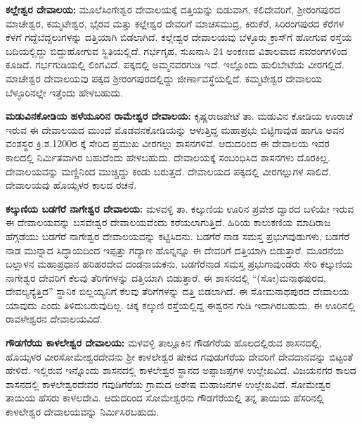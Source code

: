\vskip 3pt

\textbf{ಕಲ್ಲೇಶ್ವರ ದೇವಾಲಯ: } ಮೂಲೆಸಿಂಗೇಶ್ವರ ದೇವಾಲಯಕ್ಕೆ ದತ್ತಿಯನ್ನು ಬಿಡುವಾಗ, ಕಲಿದೇವರಿಗೆ, ಶ‍್ರೀರಂಗಪುರದ ಮಾಚೇಶ್ವರ, ಕಮ್ಮಟೇಶ್ವರ, ಭೈರವ ಮತ್ತು ಕಲ್ಲೇಶ್ವರ ದೇವರಿಗೆ ಮಾಚಸಮುದ್ರ, ಕಿರುಕೆರೆ, ಸಿರಿರಂಗಪುರದ ಕೆರೆಗಳ ಕೆಳಗೆ ಗದ್ದೆಬೆದ್ದಲುಗಳನ್ನು ದತ್ತಿಯಾಗಿ ಬಿಡಲಾಗಿದೆ. ಕಲ್ಲೇಶ್ವರ ದೇವಾಲಯವು ಬೆಳ್ಳೂರು ಕ್ರಾಸ್​ಗೆ ಹೋಗುವ ರಸ್ತೆಯ ಬದಿಯಲ್ಲಿದ್ದು ಬಿದ್ದುಹೋಗುವ ಸ್ಥಿತಿಯಲ್ಲಿದೆ. ಗರ್ಭಗೃಹ, ಸುಖನಾಸಿ 24 ಅಂಕಣದ ವಿಶಾಲವಾದ ನವರಂಗಗಳಿಂದ ಕೂಡಿದೆ. ಗರ್ಭಗುಡಿಯಲ್ಲಿ ಲಿಂಗವಿದೆ. ಪಕ್ಕದಲ್ಲಿ ಅಮ್ಮನವರಗುಡಿ ಇದೆ. ಇಲ್ಲೊಂದು ಹುಲಿಬೇಟೆಯ ವೀರಗಲ್ಲಿದೆ. ಮಾಚೇಶ್ವರ ದೇವಾಲಯವು ಪಕ್ಕದ ಶ‍್ರೀರಂಗಪುರದಲ್ಲಿದ್ದು ಜೀರ್ಣಾವಸ್ಥೆಯಲ್ಲಿದೆ. ಕಮ್ಮಟೇಶ್ವರ ದೇವಾಲಯ ಬೆಳ್ಳೂರಿನಲ್ಲೇ ಇತ್ತೆಂದು ಹೇಳಬಹುದು.

\vskip 3pt

\textbf{ಮಡುವಿನಕೋಡಿಯ ಹಳೆಯೂರಿನ ರಾಮೇಶ್ವರ ದೇವಾಲಯ:} ಕೃಷ್ಣರಾಜಪೇಟೆ ತಾ. ಮಡುವಿನ ಕೋಡಿಯ \hbox{ಊರಾಚೆ} ಇರುವ ಈ ದೇವಾಲಯದ ಮುಂದೆ ಮೊಡವನಕೋಡಿ\-ಯನ್ನು ಆಳುತ್ತಿದ್ದ ಮಹಾಪ್ರಭು ಬಿಟ್ಟಿಗಾವುಡ ಹಾಗೂ ಅವನ ವಂಶಸ್ಥರ ಕ್ರಿ.ಶ.1200ರ ಕ್ಕೆ ಸೇರಿದ ಪ್ರಮುಖ ವೀರಗಲ್ಲು ಶಾಸನಗಳಿವೆ. ಆದುದರಿಂದ ಈ ದೇವಾಲಯ ಇವರ ಕಾಲದಲ್ಲಿ ನಿರ್ಮಿತವಾಗಿರ ಬಹುದೆಂದು ಹೇಳಬಹುದು. ದೇವಾಲಯಕ್ಕೆ ಸಂಬಂಧಿಸಿದ ಶಾಸನಗಳು ದೊರಕಿಲ್ಲ. ದೇವಾಲಯವನ್ನು ಮಣ್ಣಿನಿಂದ ಮುಚ್ಚಿದ್ದು ಕಂಡು ಬರುತ್ತದೆ. ದೇವಾಲಯದ ಪಕ್ಕದಲ್ಲಿ ವೀರಗಲ್ಲುಗಳ ಸಾಲಿದೆ. ದೇವಾಲಯವು ಹೊಯ್ಸಳರ ಕಾಲದ ರಚನೆ.

\vskip 3pt

\textbf{ಕಲ್ಕುಣಿಯ ಬಡಗೆರೆ ನಾಗೇಶ್ವರ ದೇವಾಲಯ:} ಮಳವಳ್ಳಿ ತಾ. ಕಲ್ಕುಣಿಯ ಊರಿನ ಪ್ರವೇಶ ದ್ವಾರದ ಬಳಿಯೇ ಇರುವ ಈ ದೇವಾಲಯವನ್ನು ಬಸವೇಶ್ವರ ದೇವಾಲಯವೆಂದು ಕರೆಯಲಾಗುತ್ತಿದೆ. ಹಿರಿಯ ಕಾಲುಕಣಿಯ ಮಾದಿರಾಜ ಹೆಗ್ಗಡೆಯು ಬಡಗೆರೆ ನಾಗೇಶ್ವರ ದೇವಾಲಯವನ್ನು ಕಟ್ಟಿಸಿದನು. ಬಡಗೆರೆ ನಾಡ ಸಮಸ್ತ ಪ್ರಭುಗವುಡುಗಳು, ಬಡಗೆರೆ ನಾಡ ಮುನ್ನಾದ ಸಿದ್ಧಾಯದಿಂದ ಇಪ್ಪತ್ತು ಗದ್ಯಾಣ ಹೊನ್ನನ್ನೂ ಈ ದೇವರಿಗೆ ದತ್ತಿಯಾಗಿ ಬಿಡುತ್ತಾರೆ. ಮೂರನೆಯ ಬಲ್ಲಾಳನ ಮಹಾಪ್ರಧಾನ ಹರಿಹರದೇವ ದಂಡನಾಯಕನು, ಬಡಗೆರೆನಾಡ ಸಮಸ್ತ ಪ್ರಭುಗಾವುಂಡರು ಸೇರಿ ಕಲ್ಕುಣಿಯ ನಾಗೇಶ್ವರ ದೇವರಿಗೆ ಕೆಲವು ತೆರಿಗೆಗಳನ್ನು ದತ್ತಿಯಾಗಿ ಬಿಡುತ್ತಾರೆ. ಈ ಶಾಸನದಲ್ಲಿ “(ಸೋ)ಮನಾಥಪುರದ, ದೇವಲ್ಯನ್ಯೆತ್ತಿದ” ಸ್ಥಾನಿಕ ಬಿಲ್ಲಯ್ಯನಿಗೆ ಕೆಲವು ತೆರಿಗೆಗಳನ್ನು ದತ್ತಿ ಬಿಡಲಾಗಿದೆ. ಈ ಸೋಮನಾಥಪುರದ ದೇವಾಲಯ ಯಾವುದು ಎಂದು ತಿಳಿದುಬರುವುದಿಲ್ಲ. ಚಿಕ್ಕ ಕಲ್ಕುಣಿ ರಸ್ತೆಯಲ್ಲಿದ್ದ ಈಶ್ವರನ ಗುಡಿ ಇದಾಗಿರಬಹುದು. ಈ ಊರಿನಲ್ಲಿ ರಾವಳೇಶ್ವರನ ದೇವಾಲಯವಿದೆ.

\textbf{ಗೌಡಗೆರೆಯ ಕಾಳಲೇಶ್ವರ ದೇವಾಲಯ:} ಮಳವಳ್ಳಿ ತಾಲ್ಲೂಕಿನ ಗೌಡಗೆರೆಯ ಹೊಲದಲ್ಲಿರುವ ಶಾಸನದಲ್ಲಿ, ಹೊಯ್ಸಳರ ವೀರಸೋಮೇಶ್ವರದೇವನು ಶ‍್ರೀ ಕಾಳಲೇಶ್ವರ ಷೇಕದ ಗವುಡುಗೆರೆಯ ದೇವರಿಗೆ ದೇವದಾನವನ್ನು ಬಿಟ್ಟಂತೆ ಹೇಳಿದೆ. ಇಲ್ಲಿರುವ ಇನ್ನೊಂದು ಶಾಸನದಲ್ಲಿ ಕಾಳಲೇಶ್ವರ ಸ್ಥಾನದ ಅಪ್ಪಾಜಪ್ಪಗಳ ಉಲ್ಲೇಖವಿದೆ. ವಿಜಯನಗರ ಕಾಲದ ಶಾಸನದಲ್ಲಿ ಕಾಳಲೇಶ್ವರದೇವರ ಗವುಡಿಗೆರೆಯ ಗ್ರಾಮದ ಅಶೇಷ ಮಹಾಜನಗಳ ಉಲ್ಲೇಖವಿದೆ. ಸೋಮೇಶ್ವರ ತಾಯಿಯ ಹೆಸರು ಕಾಳಲದೇವಿ. ಆದುದರಿಂದ ಸೋಮೇಶ್ವರನು ಗೌಡಗೆರೆಯಲ್ಲಿ ತನ್ನ ತಾಯಿಯ ಹೆಸರಿನಲ್ಲಿ ಕಾಳಲೇಶ್ವರ ದೇವಾಲಯವನ್ನು ನಿರ್ಮಿಸಿರಬಹುದು.

